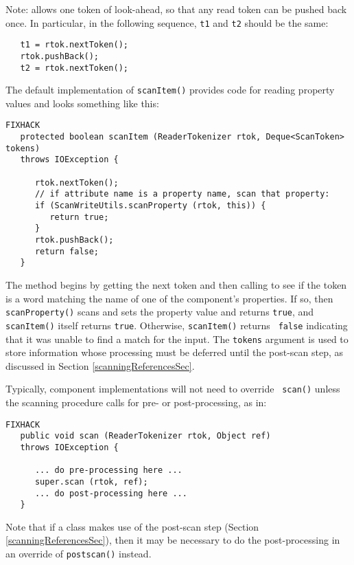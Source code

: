 \documentclass{article}
\begin{document}
\begin{sideblock}
Note:  allows one
token of look-ahead, so that any read token can be pushed
back once. In particular, in the following sequence,
{\tt t1} and {\tt t2} should be the same:
\begin{verbatim}
   t1 = rtok.nextToken();
   rtok.pushBack();
   t2 = rtok.nextToken();
\end{verbatim}
\end{sideblock}

The default implementation of {\tt scanItem()} provides
code for reading property values and looks something like this:
\begin{lstlisting}FIXHACK
   protected boolean scanItem (ReaderTokenizer rtok, Deque<ScanToken> tokens)
   throws IOException {

      rtok.nextToken();
      // if attribute name is a property name, scan that property:
      if (ScanWriteUtils.scanProperty (rtok, this)) {
         return true;
      }
      rtok.pushBack();
      return false;
   }
\end{lstlisting}
The method begins by getting the next token and then calling
to see if the token is a word matching the name of one of the
component's properties. If so, then {\tt scanProperty()} scans and
sets the property value and returns {\tt true}, and {\tt scanItem()}
itself returns {\tt true}. Otherwise, {\tt scanItem()} returns {\tt
false} indicating that it was unable to find a match for the input.
The {\tt tokens} argument is used to store information whose
processing must be deferred until the post-scan step, as discussed in
Section \ref{scanningReferencesSec}.

Typically, component implementations will not need to override {\tt
scan()} unless the scanning procedure calls for pre- or
post-processing, as in:
\begin{lstlisting}FIXHACK
   public void scan (ReaderTokenizer rtok, Object ref) 
   throws IOException {

      ... do pre-processing here ...
      super.scan (rtok, ref);
      ... do post-processing here ...
   }   
\end{lstlisting}
Note that if a class makes use of the post-scan step (Section
\ref{scanningReferencesSec}), then it may be necessary to do the
post-processing in an override of {\tt postscan()} instead.
\end{document}
